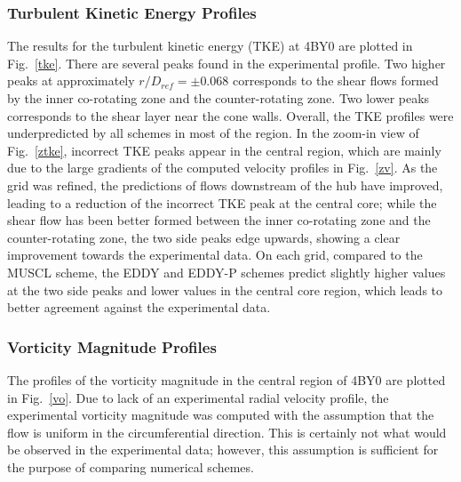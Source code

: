 \subsubsection{Turbulent Kinetic Energy Profiles}
The results for the turbulent kinetic energy (TKE)  at 4BY0 are plotted in Fig.~\ref{tke}. There are several peaks found in the experimental profile. Two higher peaks at approximately $r/D_{ref}=\pm 0.068$ corresponds to the shear flows formed by the inner co-rotating zone and the counter-rotating zone. Two lower peaks corresponds to the shear layer near the cone walls. Overall, the TKE profiles were underpredicted by all schemes in most of the region. In the zoom-in view of Fig.~\ref{ztke}, incorrect TKE peaks appear in the central region, which are mainly due to the large gradients of the computed velocity profiles in Fig.~\ref{zv}. As the grid was refined, the predictions of flows downstream of the hub have improved, leading to a reduction of the incorrect TKE peak at the central core; while the shear flow has been better formed between the inner co-rotating zone and the counter-rotating zone, the two side peaks edge upwards, showing a clear improvement towards the experimental data. On each grid, compared to the MUSCL scheme, the EDDY and EDDY-P schemes predict slightly higher values at the two side peaks and lower values in the central core region, which leads to better agreement against the experimental data. 
\subsubsection{Vorticity Magnitude Profiles}
The profiles of the vorticity magnitude in the central region of 4BY0 are plotted in Fig.~\ref{vo}. Due to lack of an experimental radial velocity profile, the experimental vorticity magnitude was computed with the assumption that the flow is uniform in the circumferential direction. This is certainly not what would be observed in the experimental data; however, this assumption is sufficient for the purpose of comparing numerical schemes. 

